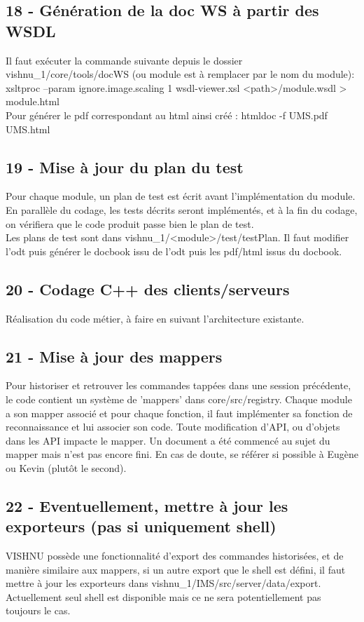 \documentclass{article}
\begin{document}
\subsection{18 - Génération de la doc WS à partir des WSDL}
Il faut exécuter la commande suivante depuis le dossier vishnu\_1/core/tools/docWS (ou module est à remplacer par le nom du module):\\
xsltproc --param ignore.image.scaling 1 wsdl-viewer.xsl <path>/module.wsdl > module.html \\
Pour générer le pdf correspondant au html ainsi créé :
htmldoc -f UMS.pdf UMS.html

\subsection{19 - Mise à jour du plan du test}
Pour chaque module, un plan de test est écrit avant l'implémentation
du module. En parallèle du codage, les tests décrits seront implémentés,
et à la fin du codage, on vérifiera que le code produit passe bien
le plan de test. \\
Les plans de test sont dans vishnu\_1/<module>/test/testPlan. Il faut modifier
l'odt puis générer le docbook issu de l'odt puis les pdf/html issus du docbook.

\subsection{20 - Codage C++ des clients/serveurs}
Réalisation du code métier, à faire en suivant l'architecture existante.

\subsection{21 - Mise à jour des mappers}
Pour historiser et retrouver les commandes tappées dans une session précédente,
le code contient un système de 'mappers' dans core/src/registry. Chaque module
a son mapper associé et pour chaque fonction, il faut implémenter sa fonction
de reconnaissance et lui associer son code. Toute modification d'API, ou
d'objets dans les API impacte le mapper.
Un document a été commencé au sujet du mapper mais n'est pas encore fini.
En cas de doute, se référer si possible à Eugène ou Kevin (plutôt le second).

\subsection{22 - Eventuellement, mettre à jour les exporteurs (pas si uniquement shell)}
VISHNU possède une fonctionnalité d'export des commandes historisées, et de
manière similaire aux mappers, si un autre export que le shell est défini,
il faut mettre à jour les exporteurs dans vishnu\_1/IMS/src/server/data/export.
Actuellement seul shell est disponible mais ce ne sera potentiellement pas
toujours le cas.
\end{document}
